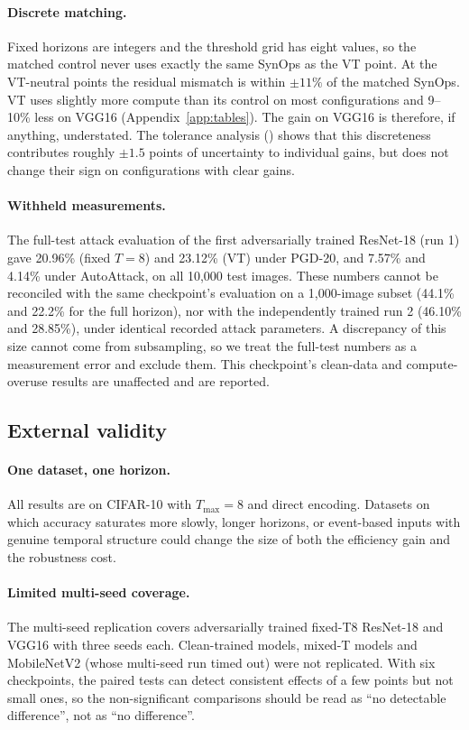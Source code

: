 \paragraph{Discrete matching.} Fixed horizons are integers and the threshold grid has eight values, so the matched control never uses exactly the same SynOps as the VT point. At the VT-neutral points the residual mismatch is within $\pm 11\%$ of the matched SynOps. VT uses slightly more compute than its control on most configurations and 9--10\% less on VGG16 (Appendix~\ref{app:tables}). The gain on VGG16 is therefore, if anything, understated. The tolerance analysis () shows that this discreteness contributes roughly $\pm 1.5$ points of uncertainty to individual gains, but does not change their sign on configurations with clear gains.

\paragraph{Withheld measurements.} The full-test attack evaluation of the first adversarially trained ResNet-18 (run 1) gave 20.96\% (fixed $T = 8$) and 23.12\% (VT) under PGD-20, and 7.57\% and 4.14\% under AutoAttack, on all 10{,}000 test images. These numbers cannot be reconciled with the same checkpoint's evaluation on a 1{,}000-image subset (44.1\% and 22.2\% for the full horizon), nor with the independently trained run 2 (46.10\% and 28.85\%), under identical recorded attack parameters. A discrepancy of this size cannot come from subsampling, so we treat the full-test numbers as a measurement error and exclude them. This checkpoint's clean-data and compute-overuse results are unaffected and are reported.

\subsection{External validity}

\paragraph{One dataset, one horizon.} All results are on CIFAR-10 with $T_{\max} = 8$ and direct encoding. Datasets on which accuracy saturates more slowly, longer horizons, or event-based inputs with genuine temporal structure could change the size of both the efficiency gain and the robustness cost.

\paragraph{Limited multi-seed coverage.} The multi-seed replication covers adversarially trained fixed-T8 ResNet-18 and VGG16 with three seeds each. Clean-trained models, mixed-T models and MobileNetV2 (whose multi-seed run timed out) were not replicated. With six checkpoints, the paired tests can detect consistent effects of a few points but not small ones, so the non-significant comparisons should be read as ``no detectable difference'', not as ``no difference''.

